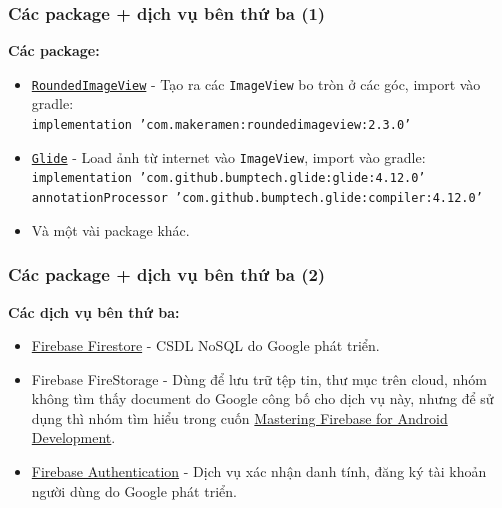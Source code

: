 \documentclass{beamer}
\begin{document}
\begin{frame}
    \frametitle{Các package + dịch vụ bên thứ ba (1)}
    \begin{flushleft}
        \large{\textbf{Các package:}}
        \begin{itemize}
            \item \textnormal{\href{https://github.com/vinc3m1/RoundedImageView}{\color{blue} \texttt{RoundedImageView}} - Tạo ra các \texttt{ImageView} bo tròn ở các góc, import vào gradle:}\\\texttt{\scriptsize{implementation 'com.makeramen:roundedimageview:2.3.0'}}

            \item \textnormal{\href{https://github.com/bumptech/glide}{\color{blue} \texttt{Glide}} - Load ảnh từ internet vào \texttt{ImageView}, import vào gradle:}\\\texttt{\scriptsize{implementation 'com.github.bumptech.glide:glide:4.12.0'\\annotationProcessor 'com.github.bumptech.glide:compiler:4.12.0'}}

            \item Và một vài package khác.
        \end{itemize}
    \end{flushleft}
\end{frame}

\begin{frame}
    \frametitle{Các package + dịch vụ bên thứ ba (2)}
    \begin{flushleft}
        \large{\textbf{Các dịch vụ bên thứ ba:}}
        \begin{itemize}
            \item \textnormal{\href{https://firebase.google.com/docs/firestore/quickstart}{\color{blue} \textsf{Firebase Firestore}} - CSDL NoSQL do Google phát triển.}

            \item \textnormal{Firebase FireStorage - Dùng để lưu trữ tệp tin, thư mục trên cloud, nhóm không tìm thấy document do Google công bố cho dịch vụ này, nhưng để sử dụng thì nhóm tìm hiểu trong cuốn} \href{https://www.amazon.com/Mastering-Firebase-Android-Development-cloud-enabled/dp/1788624718}{\color{teal} Mastering Firebase for Android Development}.

            \item \textnormal{\href{https://firebase.google.com/docs/auth/android/start}{\color{blue} \textsf{Firebase Authentication}} - Dịch vụ xác nhận danh tính, đăng ký tài khoản người dùng do Google phát triển.}
        \end{itemize}
    \end{flushleft}
\end{frame}
\end{document}
